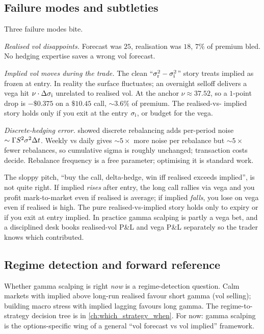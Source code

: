 \subsection{Failure modes and subtleties}
\label{subsec:ch17_gs_failures}

Three failure modes bite.

\emph{Realised vol disappoints.} Forecast was $25$, realisation
was $18$, $7\%$ of premium bled. No hedging expertise saves a
wrong vol forecast.

\emph{Implied vol moves during the trade.} The clean
``$\sigma_{\text{r}}^2 - \sigma_{\text{i}}^2$'' story treats
implied as frozen at entry. In reality the surface fluctuates; an
overnight selloff delivers a vega hit
$\nu \cdot \Delta \sigma_{\text{i}}$ unrelated to realised vol. At
the anchor $\nu \approx 37.52$, so a $1$-point drop is $-\$0.375$
on a $\$10.45$ call, $\sim 3.6\%$ of premium. The realised-vs-%
implied story holds only if you exit at the entry
$\sigma_{\text{i}}$, or budget for the vega.

\emph{Discrete-hedging error.}  showed
discrete rebalancing adds per-period noise
$\sim \Gamma S^2 \sigma^2 \Delta t$. Weekly vs daily gives
$\sim 5\times$ more noise per rebalance but $\sim 5\times$ fewer
rebalances, so cumulative sigma is roughly unchanged; transaction
costs decide. Rebalance frequency is a free parameter; optimising
it is standard work.

\begin{pitfallbox}
The sloppy pitch, ``buy the call, delta-hedge, win iff realised
exceeds implied'', is not quite right. If implied \emph{rises}
after entry, the long call rallies via vega and you profit
mark-to-market even if realised is average; if implied
\emph{falls}, you lose on vega even if realised is high. The pure
realised-vs-implied story holds only to expiry or if you exit at
entry implied. In practice gamma scalping is partly a vega bet,
and a disciplined desk books realised-vol P\&L and vega P\&L
separately so the trader knows which contributed.
\end{pitfallbox}

\subsection{Regime detection and forward reference}
\label{subsec:ch17_regime}

Whether gamma scalping is right \emph{now} is a regime-detection
question. Calm markets with implied above long-run realised favour
short gamma (vol selling); building macro stress with implied
lagging favours long gamma. The regime-to-strategy decision tree
is in \cref{ch:which_strategy_when}. For now: gamma scalping is
the options-specific wing of a general ``vol forecast vs vol
implied'' framework.

